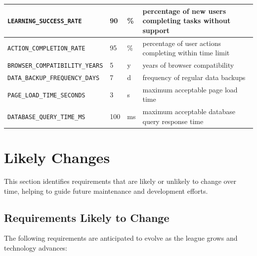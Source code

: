 \documentclass[12pt, titlepage]{article}
\begin{document}
\begin{longtable}{|l|l|l|p{5cm}|}
    \texttt{LEARNING\_SUCCESS\_RATE}\label{LEARNING_SUCCESS_RATE} & 90 & \% & percentage of new users completing tasks without support \\ \hline
    \texttt{ACTION\_COMPLETION\_RATE}\label{ACTION_COMPLETION_RATE} & 95 & \% & percentage of user actions completing within time limit \\ \hline
    \texttt{BROWSER\_COMPATIBILITY\_YEARS}\label{BROWSER_COMPATIBILITY_YEARS} & 5 & y & years of browser compatibility \\ \hline
    \texttt{DATA\_BACKUP\_FREQUENCY\_DAYS}\label{DATA_BACKUP_FREQUENCY_DAYS} & 7 & d & frequency of regular data backups \\ \hline
    \texttt{PAGE\_LOAD\_TIME\_SECONDS}\label{PAGE_LOAD_TIME_SECONDS} & 3 & s & maximum acceptable page load time \\ \hline
    \texttt{DATABASE\_QUERY\_TIME\_MS}\label{DATABASE_QUERY_TIME_MS} & 100 & ms & maximum acceptable database query response time \\ \hline
\end{longtable}

\section{Likely Changes}
This section identifies requirements that are likely or unlikely to change over time, helping to guide future maintenance and development efforts.

\subsection{Requirements Likely to Change}
The following requirements are anticipated to evolve as the league grows and technology advances:
\end{document}

